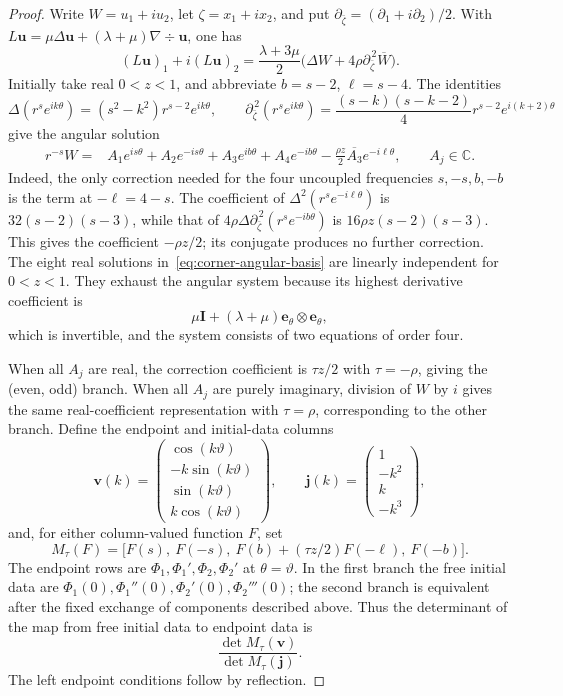 \begin{proof}
Write $W=u_1+iu_2$, let $\zeta=x_1+ix_2$, and put $\partial_{\bar\zeta}=(\partial_1+i\partial_2)/2$. With $L\boldsymbol u=\mu\Delta\boldsymbol u+(\lambda+\mu)\nabla\div\boldsymbol u$, one has
\[
(L\boldsymbol u)_1+i(L\boldsymbol u)_2
=\frac{\lambda+3\mu}{2}\big(\Delta W+4\rho\partial_{\bar\zeta}^{\,2}\overline W\big).
\]
Initially take real $0<z<1$, and abbreviate $b=s-2$, $\ell=s-4$. The identities
\[
\Delta(r^s e^{ik\theta})=(s^2-k^2)r^{s-2}e^{ik\theta},
\qquad
\partial_{\bar\zeta}^{\,2}(r^s e^{ik\theta})
=\frac{(s-k)(s-k-2)}4r^{s-2}e^{i(k+2)\theta}
\]
give the angular solution
\begin{equation}\label{eq:corner-angular-basis}
\begin{aligned}
r^{-s}W={}&A_1e^{is\theta}+A_2e^{-is\theta}
+A_3e^{ib\theta}+A_4e^{-ib\theta}
-\frac{\rho z}{2}\overline{A_3}e^{-i\ell\theta},
\qquad A_j\in\mathbb C.
\end{aligned}
\end{equation}
Indeed, the only correction needed for the four uncoupled frequencies $s,-s,b,-b$ is the term at $-\ell=4-s$. The coefficient of $\Delta^2(r^s e^{-i\ell\theta})$ is $32(s-2)(s-3)$, while that of $4\rho\Delta\partial_{\bar\zeta}^{\,2}(r^s e^{-ib\theta})$ is $16\rho z(s-2)(s-3)$. This gives the coefficient $-\rho z/2$; its conjugate produces no further correction. The eight real solutions in~\eqref{eq:corner-angular-basis} are linearly independent for $0<z<1$. They exhaust the angular system because its highest derivative coefficient is
\[
\mu\boldsymbol I+(\lambda+\mu)\boldsymbol e_\theta\otimes\boldsymbol e_\theta,
\]
which is invertible, and the system consists of two equations of order four.

When all $A_j$ are real, the correction coefficient is $\tau z/2$ with $\tau=-\rho$, giving the (even, odd) branch. When all $A_j$ are purely imaginary, division of $W$ by $i$ gives the same real-coefficient representation with $\tau=\rho$, corresponding to the other branch. Define the endpoint and initial-data columns
\[
\boldsymbol v(k)=
\begin{pmatrix}\cos(k\vartheta)\\-k\sin(k\vartheta)\\\sin(k\vartheta)\\k\cos(k\vartheta)\end{pmatrix},
\qquad
\boldsymbol j(k)=\begin{pmatrix}1\\-k^2\\k\\-k^3\end{pmatrix},
\]
and, for either column-valued function $F$, set
\[
M_\tau(F)=\big[F(s),\ F(-s),\ F(b)+(\tau z/2)F(-\ell),\ F(-b)\big].
\]
The endpoint rows are $\Phi_1,\Phi_1',\Phi_2,\Phi_2'$ at $\theta=\vartheta$. In the first branch the free initial data are $\Phi_1(0),\Phi_1''(0),\Phi_2'(0),\Phi_2'''(0)$; the second branch is equivalent after the fixed exchange of components described above. Thus the determinant of the map from free initial data to endpoint data is
\[
\frac{\det M_\tau(\boldsymbol v)}{\det M_\tau(\boldsymbol j)}.
\]
The left endpoint conditions follow by reflection.


\end{proof}
